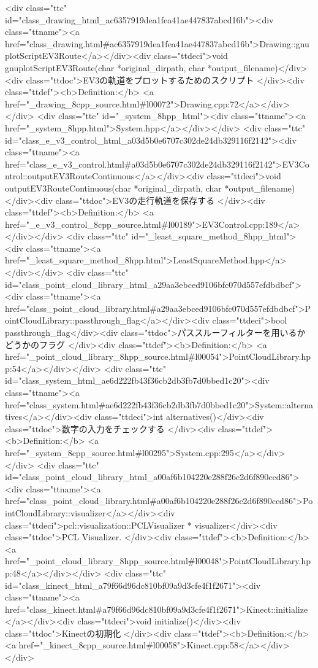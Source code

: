 <div class="ttc" id="class_drawing_html_ac6357919dea1fea41ae447837abcd16b"><div class="ttname"><a href="class_drawing.html#ac6357919dea1fea41ae447837abcd16b">Drawing::gnuplotScriptEV3Route</a></div><div class="ttdeci">void gnuplotScriptEV3Route(char *original_dirpath, char *output_filename)</div><div class="ttdoc">EV3の軌道をプロットするためのスクリプト </div><div class="ttdef"><b>Definition:</b> <a href="_drawing_8cpp_source.html#l00072">Drawing.cpp:72</a></div></div>
<div class="ttc" id="_system_8hpp_html"><div class="ttname"><a href="_system_8hpp.html">System.hpp</a></div></div>
<div class="ttc" id="class_e_v3_control_html_a03d5b0e6707c302de24db329116f2142"><div class="ttname"><a href="class_e_v3_control.html#a03d5b0e6707c302de24db329116f2142">EV3Control::outputEV3RouteContinuous</a></div><div class="ttdeci">void outputEV3RouteContinuous(char *original_dirpath, char *output_filename)</div><div class="ttdoc">EV3の走行軌道を保存する </div><div class="ttdef"><b>Definition:</b> <a href="_e_v3_control_8cpp_source.html#l00189">EV3Control.cpp:189</a></div></div>
<div class="ttc" id="_least_square_method_8hpp_html"><div class="ttname"><a href="_least_square_method_8hpp.html">LeastSquareMethod.hpp</a></div></div>
<div class="ttc" id="class_point_cloud_library_html_a29aa3ebced9106bfc070d557efdbdbcf"><div class="ttname"><a href="class_point_cloud_library.html#a29aa3ebced9106bfc070d557efdbdbcf">PointCloudLibrary::passthrough_flag</a></div><div class="ttdeci">bool passthrough_flag</div><div class="ttdoc">パススルーフィルターを用いるかどうかのフラグ </div><div class="ttdef"><b>Definition:</b> <a href="_point_cloud_library_8hpp_source.html#l00054">PointCloudLibrary.hpp:54</a></div></div>
<div class="ttc" id="class_system_html_ae6d222fb43f36cb2db3fb7d0bbed1c20"><div class="ttname"><a href="class_system.html#ae6d222fb43f36cb2db3fb7d0bbed1c20">System::alternatives</a></div><div class="ttdeci">int alternatives()</div><div class="ttdoc">数字の入力をチェックする </div><div class="ttdef"><b>Definition:</b> <a href="_system_8cpp_source.html#l00295">System.cpp:295</a></div></div>
<div class="ttc" id="class_point_cloud_library_html_a00af6b104220e288f26c2d6f890ccd86"><div class="ttname"><a href="class_point_cloud_library.html#a00af6b104220e288f26c2d6f890ccd86">PointCloudLibrary::visualizer</a></div><div class="ttdeci">pcl::visualization::PCLVisualizer * visualizer</div><div class="ttdoc">PCL Visualizer. </div><div class="ttdef"><b>Definition:</b> <a href="_point_cloud_library_8hpp_source.html#l00048">PointCloudLibrary.hpp:48</a></div></div>
<div class="ttc" id="class_kinect_html_a79f66d96dc810bf09a9d3cfe4f1f2671"><div class="ttname"><a href="class_kinect.html#a79f66d96dc810bf09a9d3cfe4f1f2671">Kinect::initialize</a></div><div class="ttdeci">void initialize()</div><div class="ttdoc">Kinectの初期化 </div><div class="ttdef"><b>Definition:</b> <a href="_kinect_8cpp_source.html#l00058">Kinect.cpp:58</a></div></div>
